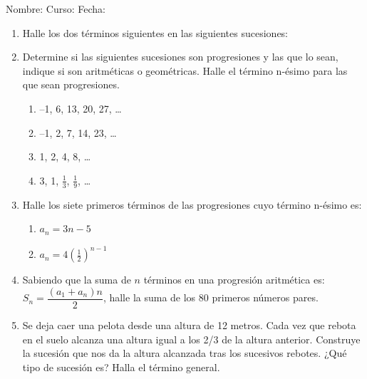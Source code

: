 \documentclass[fleqn]{article}
\newcommand{\LineaNombre}{%
\par
\vspace{\baselineskip}
Nombre:\hrulefill \; Curso: \underline{\hspace*{48pt}} \; Fecha: \underline{\hspace*{2.5cm}} \relax
\par}
\begin{document}
\LineaNombre
\begin{enumerate}
 \item Halle los dos términos siguientes en las siguientes sucesiones:
 \begin{enumerate}
 \end{enumerate}
 \item Determine si las siguientes sucesiones son progresiones y las que lo sean, indique si son aritméticas o geométricas. Halle el término n-ésimo para las que sean progresiones.
 \begin{enumerate}
 \item --1, 6, 13, 20, 27, \ldots \noanswer
 \item --1, 2, 7, 14, 23, \ldots \noanswer
 \item 1, 2, 4, 8, \ldots \noanswer
 \item 3, 1, $\frac{1}{3}$, $\frac{1}{9}$, \ldots \noanswer
 \end{enumerate}
 \item Halle los siete primeros términos de las progresiones cuyo término n-ésimo es:
 \begin{enumerate}
 \item $a_{n}=3n-5$\noanswer[0.25in]
 \item $a_{n}=4(\frac{1}{2})^{n-1}$ \noanswer[0.25in]
 \end{enumerate}
 \newpage
 \item Sabiendo que la suma de $n$ términos en una progresión aritmética es: $S_{n}=\dfrac{(a_{1}+a_{n})n}{2}$, halle la suma de los 80 primeros números pares.\noanswer
 \item Se deja caer una pelota desde una altura de 12 metros. Cada vez que rebota en el suelo alcanza una altura igual a los 2/3 de la altura anterior. Construye la sucesión que nos da la altura alcanzada tras los sucesivos rebotes. ¿Qué tipo de sucesión es? Halla el término general.\noanswer
 \end{enumerate}
\end{document}
